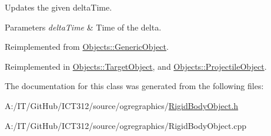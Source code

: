 Updates the given delta\-Time. 


\begin{DoxyParams}{Parameters}
{\em delta\-Time} & Time of the delta. \\
\hline
\end{DoxyParams}


Reimplemented from \hyperlink{class_objects_1_1_generic_object_a57c85bdf2ceb1ffa1b85ec3aa51a631d}{Objects\-::\-Generic\-Object}.



Reimplemented in \hyperlink{class_objects_1_1_target_object_a46b8163c5921925aa6d95fc0e99ce011}{Objects\-::\-Target\-Object}, and \hyperlink{class_objects_1_1_projectile_object_ae8cb3b7f7a9f5b921b043a58e9e355dc}{Objects\-::\-Projectile\-Object}.



The documentation for this class was generated from the following files\-:\begin{DoxyCompactItemize}
\item 
A\-:/\-I\-T/\-Git\-Hub/\-I\-C\-T312/source/ogregraphics/\hyperlink{_rigid_body_object_8h}{Rigid\-Body\-Object.\-h}\item 
A\-:/\-I\-T/\-Git\-Hub/\-I\-C\-T312/source/ogregraphics/Rigid\-Body\-Object.\-cpp\end{DoxyCompactItemize}

